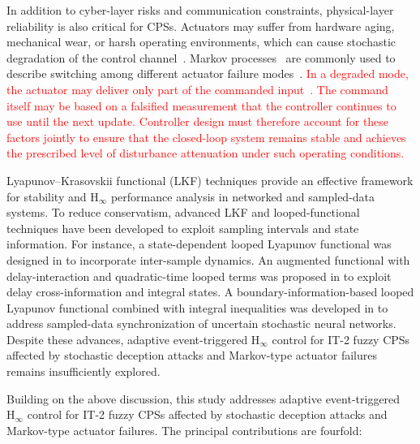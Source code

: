 \documentclass[preprint,review,fleqn,sort&compress,3p]{elsarticle}
\theoremstyle{definition} %
\theoremstyle{definition}%
\begin{document}
	In addition to cyber-layer risks and communication constraints, physical-layer reliability is also critical for CPSs. Actuators may suffer from hardware aging, mechanical wear, or harsh operating environments, which can cause stochastic degradation of the control channel~\cite{chenProbabilisticEventTriggeredPolicy2023}.
	Markov processes~\cite{yanAnnularFiniteTimeStability2026} are commonly used to describe switching among different actuator failure modes~\cite{yaoMultiSensorBasedSwitchingEventTriggered2024}.
	\textcolor{red}{In a degraded mode, the actuator may deliver only part of the commanded input~\textcolor{black}{\cite{aoFixedTimeFaultTolerantTrajectory2026}}.}
	\textcolor{red}{The command itself may be based on a falsified measurement that the controller continues to use until the next update. Controller design must therefore account for these factors jointly to ensure that the closed-loop system remains stable and achieves the prescribed level of disturbance attenuation under such operating conditions.}
	
	Lyapunov--Krasovskii functional (LKF) techniques provide an effective framework for stability and $\mathrm{H}_\infty$ performance analysis in networked and sampled-data systems. To reduce conservatism, advanced LKF and looped-functional techniques
	have been developed to exploit sampling intervals and state information. For
	instance, a state-dependent looped Lyapunov functional was designed in
	\cite{lianNewResultsStability2020} to incorporate inter-sample dynamics. An augmented functional with delay-interaction and quadratic-time looped terms was
	proposed in \cite{zhangMixedDelayBasedAugmentedFunctional2024} to exploit delay
	cross-information and integral states. A boundary-information-based looped
	Lyapunov functional combined with integral inequalities was developed in
	\cite{ganesanSynchronizationStochasticNeural2024} to address sampled-data synchronization of uncertain stochastic neural networks. Despite these advances, adaptive event-triggered $\mathrm{H}_\infty$ control for IT-2 fuzzy CPSs affected by stochastic deception attacks and Markov-type actuator failures remains insufficiently explored.
	
	Building on the above discussion, this study addresses adaptive event-triggered
	$\mathrm{H}_\infty$ control for IT-2 fuzzy CPSs affected by stochastic deception
	attacks and Markov-type actuator failures. The principal contributions are fourfold:
	
\end{document}
